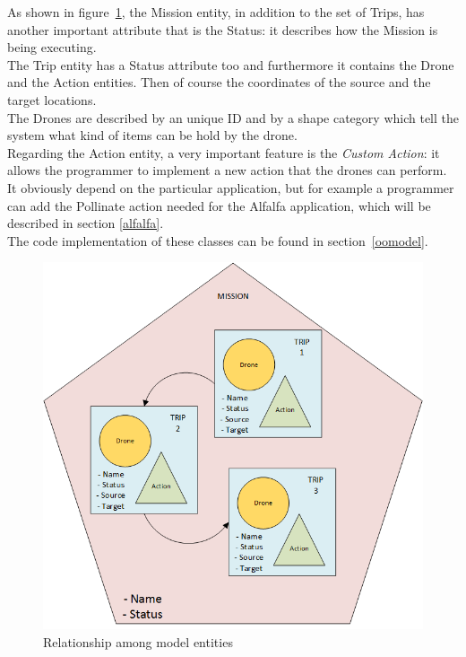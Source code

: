 As shown in figure~\ref{fig:EntityRelationship}, the Mission entity, in addition to the set of Trips, has another important attribute that is the Status: it describes how the Mission is being executing.
\\
The Trip entity has a Status attribute too and furthermore it contains the Drone and the Action entities. Then of course the coordinates of the source and the target locations.
\\
The Drones are described by an unique ID and by a shape category which tell the system what kind of items can be hold by the drone.
\\
Regarding the Action entity, a very important feature is the \textit{Custom Action}: it allows the programmer to implement a new action that the drones can perform.
It obviously depend on the particular application, but for example a programmer can add the Pollinate action needed for the Alfalfa application\cite{alfalfa}, which will be described in section \ref{alfalfa}.
\\
The code implementation of these classes can be found in section~\ref{oomodel}.

\newpage

\begin{figure}[htb]
  \centering
  \includegraphics[width=\linewidth]
  {pictures/EntityRelationship.png}
  \caption{Relationship among model entities}
  \label{fig:EntityRelationship}
\end{figure}


